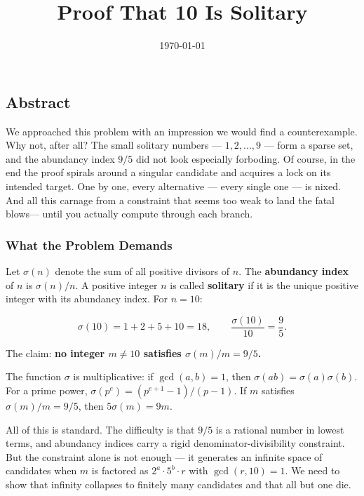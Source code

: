 \documentclass[12pt,a4paper]{article}
\begin{document}
    \title{Proof That 10 Is Solitary}
    \date{\today}

    \maketitle

    \subsection{Abstract}

    We approached this problem with an impression we would find a counterexample. Why not, after all? The small solitary numbers --- $1,2,...,9$ --- form a sparse set, and the abundancy index $9/5$ did not look especially forboding. Of course, in the end the proof spirals around a singular candidate and acquires a lock on its intended target. One by one, every alternative --- every single one --- is  nixed. And all this carnage from a constraint that seems too weak to land the fatal blows--- until you actually compute through each branch.

    \subsubsection{What the Problem Demands}

    Let $\sigma(n)$ denote the sum of all positive divisors of $n$. The \textbf{abundancy index} of $n$ is $\sigma(n)/n$. A positive integer $n$ is called \textbf{solitary} if it is the unique positive integer with its abundancy index. For $n = 10$:

    \[\sigma(10) = 1 + 2 + 5 + 10 = 18, \qquad \frac{\sigma(10)}{10} = \frac{9}{5}.\]

    The claim: \textbf{no integer $m \neq 10$ satisfies $\sigma(m)/m = 9/5$.}

    The function $\sigma$ is multiplicative: if $\gcd(a,b) = 1$, then $\sigma(ab) = \sigma(a)\sigma(b)$. For a prime power, $\sigma(p^e) = (p^{e+1} - 1)/(p - 1)$. If $m$ satisfies $\sigma(m)/m = 9/5$, then $5\sigma(m) = 9m$.

    All of this is standard. The difficulty is that $9/5$ is a rational number in lowest terms, and abundancy indices carry a rigid denominator-divisibility constraint. But the constraint alone is not enough --- it generates an infinite space of candidates when $m$ is factored as $2^a \cdot 5^b \cdot r$ with $\gcd(r,10) = 1$. We need to show that infinity collapses to finitely many candidates and that all but one die.
\end{document}
